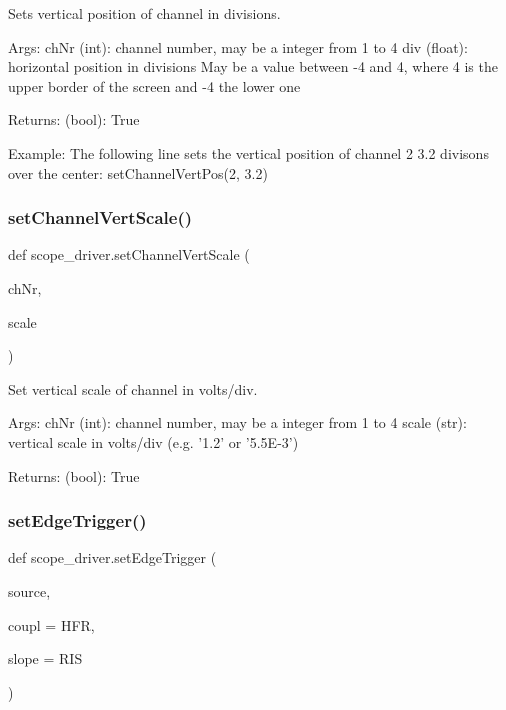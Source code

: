 \begin{DoxyVerb}Sets vertical position of channel in divisions.

Args:
    chNr (int): channel number, may be a integer from 1 to 4
    div (float): horizontal position in divisions
        May be a value between -4 and 4, where 4 is the upper border
        of the screen and -4 the lower one

Returns:
    (bool): True
    
Example:
    The following line sets the vertical position of channel 2
    3.2 divisons over the center:
        setChannelVertPos(2, 3.2)
\end{DoxyVerb}
 \mbox{\label{namespacescope__driver_a92103c5941e85daf979f2902c78999da}} 
\subsubsection{\texorpdfstring{set\+Channel\+Vert\+Scale()}{setChannelVertScale()}}
{\footnotesize\ttfamily def scope\+\_\+driver.\+set\+Channel\+Vert\+Scale (\begin{DoxyParamCaption}\item[{}]{ch\+Nr,  }\item[{}]{scale }\end{DoxyParamCaption})}

\begin{DoxyVerb}Set vertical scale of channel in volts/div.

Args:
    chNr (int): channel number, may be a integer from 1 to 4
    scale (str): vertical scale in volts/div 
        (e.g. '1.2' or '5.5E-3')
    
Returns:
    (bool): True
\end{DoxyVerb}
 \mbox{\label{namespacescope__driver_a59b84d3870dd3beb19f089d52755b041}} 
\subsubsection{\texorpdfstring{set\+Edge\+Trigger()}{setEdgeTrigger()}}
{\footnotesize\ttfamily def scope\+\_\+driver.\+set\+Edge\+Trigger (\begin{DoxyParamCaption}\item[{}]{source,  }\item[{}]{coupl = {\ttfamily \textquotesingle{}HFR\textquotesingle{}},  }\item[{}]{slope = {\ttfamily \textquotesingle{}RIS\textquotesingle{}} }\end{DoxyParamCaption})}

